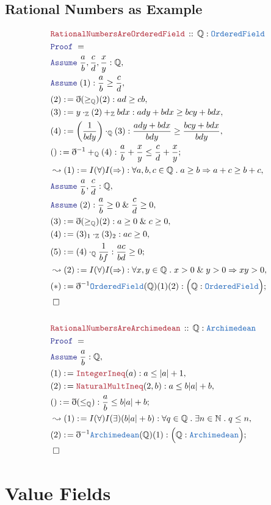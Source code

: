 \documentclass[12pt]{scrartcl}
\newcommand{\TYPE}[1]{\textcolor{NavyBlue}{\mathtt{#1}}}
\newcommand{\LOGIC}[1]{\textcolor{Blue}{\mathtt{#1}}}
\newcommand{\THM}[1]{\textcolor{Maroon}{\mathtt{#1}}}
\renewcommand{\.}{\; . \;}
\newcommand{\de}{: \kern 0.1pc =}
\newcommand{\Theorem}[2]{& \THM{#1} \, :: \, #2 \\ & \Proof = \\ }
\newcommand{\Page}[1]{ \begin{align*} #1 \end{align*}   }
\newcommand{ \bd }{ \ByDef }
\renewcommand{\And}{\; \& \;}
\newcommand{\Int}{\mathbb{Z} }
\newcommand{\Rats}{\mathbb{Q} }
\newcommand{\Nat}{\mathbb{N} }
\newcommand{\Say}[3]{& #1 \de #2 : #3, \\}
\newcommand{\Conclude}[3]{& #1 \de #2 : #3; \\}
\newcommand{\Derive}[3]{& \leadsto #1 \de #2 : #3, \\}
\newcommand{\A}{\LOGIC{Assume} \;}
\newcommand{\Assume}[2]{& \A #1 : #2, \\}
\newcommand{\QED}{\; \square}
\newcommand{\EndProof}{& \QED \\}
\newcommand{\ByDef}{\eth}
\newcommand{\Proof}{\LOGIC{Proof} \; }
\newcommand{\OF}{\TYPE{OrderedField}}
\begin{document}
\subsection{Rational Numbers as Example}
\Page{
	\Theorem{RationalNumbersAreOrderedField}{\Rats : \OF}
	\Assume{\frac{a}{b},\frac{c}{d},\frac{x}{y}}{\Rats}
	\Assume{(1)}{\frac{a}{b} \ge \frac{c}{d}}
	\Say{(2)}{\bd (\ge_{\Rats})(2)}{ ad \ge  cb   }
	\Say{(3)}{  y \cdot_{\Int} (2) +_{\Int} bdx   }{ ady + bdx \ge bcy + bdx   }
	\Say{(4)}{ \left( \frac{1}{bdy} \right) \cdot_{\Rats} (3)   }{ \frac{ady + bdx}{bdy} \ge \frac{bcy + bdx}{bdy}   }
	\Conclude{()}{\bd^{-1} +_\Rats (4)}{ \frac{a}{b} + \frac{x}{y} \le \frac{c}{d} + \frac{x}{y}   }
	\Derive{(1)}{ I(\forall)I(\Rightarrow)}{ \forall a,b,c \in \Rats \. a \ge b \Rightarrow a + c \ge b + c}
	\Assume{ \frac{a}{b},\frac{c}{d}}{\Rats}
	\Assume{(2)}{ \frac{a}{b} \ge 0 \And \frac{c}{d} \ge 0}
	\Say{(3)}{\bd (\ge_\Rats) (2)}{ a \ge 0 \And c \ge 0}
	\Say{(4)}{(3)_1 \cdot_{\Int} (3)_2}{ac \ge 0}
	\Conclude{(5)}{ (4) \cdot_{\Rats}\frac{1}{bf}}{\frac{ac}{bd} \ge 0 }
	\Derive{(2)}{ I(\forall)I(\Rightarrow)}{ \forall x,y \in \Rats \.  x > 0 \And y > 0 \Rightarrow xy > 0    }
	\Conclude{(*)}{\bd^{-1} \TYPE{\OF}(\Rats)(1)(2)}{\Big(\Rats : \OF \Big)}
	\EndProof
	\\
	\Theorem{RationalNumbersAreArchimedean}{\Rats : \TYPE{Archimedean}}
	\Assume{\frac{a}{b}}{\Rats}
	\Say{ (1)  }{ \THM{IntegerIneq}(a) }{ a \le |a| + 1 }
	\Say{(2)}{ \THM{NaturalMultIneq}(2,b)}{ a \le b|a| + b  }
	\Conclude{()}{\bd(\le_{\Rats}) }{ \frac{a}{b} \le b|a| + b  }
	\Derive{(1)}{ I(\forall)I(\exists)(b|a| + b) }{ \forall q \in \Rats \. \exists n \in \Nat \. q \le n }
	\Conclude{(2)}{\bd^{-1} \TYPE{Archimedean}(\Rats)(1) }{ \Big( \Rats : \TYPE{Archimedean} \Big)   }
	\EndProof
}
\newpage
\section{Value  Fields}
\end{document}
